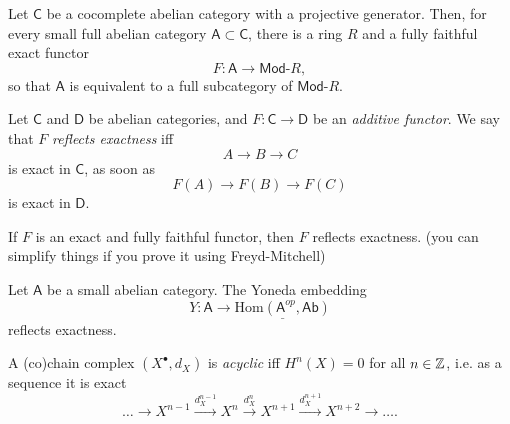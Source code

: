 \begin{thm}[]
	Let $\mathsf{C}$ be a cocomplete abelian category with a projective generator.
	Then, for every small full abelian category $\mathsf{A} \subset \mathsf{C}$,
	there is a ring $R$ and a fully faithful exact functor
	\begin{equation}
	F\colon \mathsf{A} \to \mathsf{Mod}\text{-}R
	,\end{equation} 
	so that $\mathsf{A}$ is equivalent to a full subcategory of $\mathsf{Mod}\text{-}R$.
\end{thm}

\begin{defn}
	Let $\mathsf{C}$ and $\mathsf{D}$ be abelian categories, and
	$F\colon \mathsf{C} \to \mathsf{D}$ be an {\em additive functor}.
	We say that $F$ {\em reflects exactness} iff
	\begin{equation}
	A \to B \to C
	\end{equation} 
	is exact in $\mathsf{C}$, as soon as
	\begin{equation}
		F(A) \to F(B) \to F(C)
	\end{equation} 
	is exact in $\mathsf{D}$.
\end{defn}

\begin{lem}
	If $F$ is an exact and fully faithful functor,
	then $F$ reflects exactness.
	(you can simplify things if you prove it using Freyd-Mitchell)
\end{lem} 

\begin{prop}
	Let $\mathsf{A}$ be a small abelian category.
	The Yoneda embedding
	\begin{equation}
		Y\colon \mathsf{A} \to \underline{\mathrm{Hom}\left( \mathsf{A}^{op}, \mathsf{Ab} \right)}
	\end{equation} 
	reflects exactness.
\end{prop} 

\begin{defn}
	A (co)chain complex $\left( X^{\bullet}, d_{X} \right)$ is {\em acyclic} iff 
	$H^n(X) = 0$ for all $n \in \mathbb{Z}$, i.e. as a sequence it is exact
	\begin{equation}
	\ldots \to X^{n-1} \xrightarrow{d_X^{n-1}} X^n \xrightarrow{d_X^n} 
	X^{n+1} \xrightarrow{d_X^{n+1}} X^{n+2} \to \ldots
	.\end{equation} 
\end{defn}
